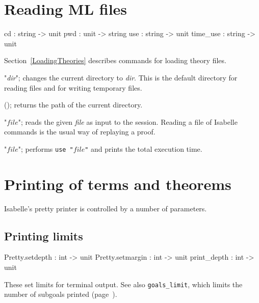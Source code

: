 \section{Reading ML files}
\begin{ttbox} 
cd              : string -> unit
pwd             : unit -> string
use             : string -> unit
time_use        : string -> unit
\end{ttbox}
Section~\ref{LoadingTheories} describes commands for loading theory files.
\begin{ttdescription}
\item[\ttindexbold{cd} "{\it dir}";]
  changes the current directory to {\it dir}.  This is the default directory
  for reading files and for writing temporary files.

\item[\ttindexbold{pwd} ();] returns the path of the current directory.

\item[\ttindexbold{use} "$file$";]  
reads the given {\it file} as input to the \ML{} session.  Reading a file
of Isabelle commands is the usual way of replaying a proof.

\item[\ttindexbold{time_use} "$file$";]  
performs {\tt use~"$file$"} and prints the total execution time.
\end{ttdescription}


\section{Printing of terms and theorems}\label{sec:printing-control}
Isabelle's pretty printer is controlled by a number of parameters.

\subsection{Printing limits}
\begin{ttbox} 
Pretty.setdepth  : int -> unit
Pretty.setmargin : int -> unit
print_depth      : int -> unit
\end{ttbox}
These set limits for terminal output.  See also {\tt goals_limit}, which
limits the number of subgoals printed (page~\pageref{sec:goals-printing}).

